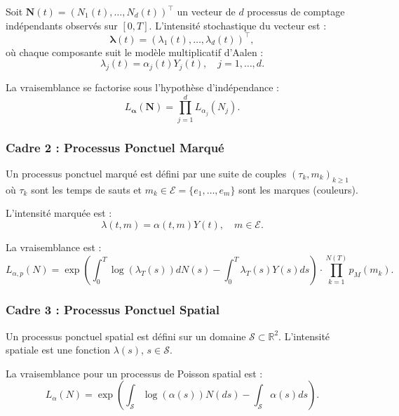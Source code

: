 \documentclass[12pt,a4paper]{article}
\begin{document}
	Soit $\mathbf{N}(t) = (N_1(t), \dots, N_d(t))^\top$ un vecteur de $d$ processus de comptage indépendants observés sur $[0,T]$. L'intensité stochastique du vecteur est :
	\begin{equation}
		\boldsymbol{\lambda}(t) = (\lambda_1(t), \dots, \lambda_d(t))^\top,
	\end{equation}
	où chaque composante suit le modèle multiplicatif d'Aalen :
	\begin{equation}
		\lambda_j(t) = \alpha_j(t)Y_j(t), \quad j = 1, \dots, d.
	\end{equation}
	
	La vraisemblance se factorise sous l'hypothèse d'indépendance :
	\begin{equation}
		L_{\boldsymbol{\alpha}}(\mathbf{N}) = \prod_{j=1}^d L_{\alpha_j}(N_j).
	\end{equation}
	
	\subsubsection{Cadre 2 : Processus Ponctuel Marqué}
	\label{subsubsec:cadre_marque}
	
	Un processus ponctuel marqué est défini par une suite de couples $(\tau_k, m_k)_{k \geq 1}$ où $\tau_k$ sont les temps de sauts et $m_k \in \mathcal{E} = \{e_1, \dots, e_m\}$ sont les marques (couleurs).
	
	L'intensité marquée est :
	\begin{equation}
		\lambda(t, m) = \alpha(t, m)Y(t), \quad m \in \mathcal{E}.
	\end{equation}
	
	La vraisemblance est :
	\begin{equation}
		L_{\alpha, p}(N) = \exp \left( \int_0^T \log(\lambda_T(s)) dN(s) - \int_0^T \lambda_T(s)Y(s) ds \right) \cdot \prod_{k=1}^{N(T)} p_M(m_k).
	\end{equation}
	
	\subsubsection{Cadre 3 : Processus Ponctuel Spatial}
	\label{subsubsec:cadre_spatial}
	
	Un processus ponctuel spatial est défini sur un domaine $\mathcal{S} \subset \mathbb{R}^2$. L'intensité spatiale est une fonction $\lambda(s)$, $s \in \mathcal{S}$.
	
	La vraisemblance pour un processus de Poisson spatial est :
	\begin{equation}
		L_{\alpha}(N) = \exp \left( \int_{\mathcal{S}} \log(\alpha(s)) N(ds) - \int_{\mathcal{S}} \alpha(s) ds \right).
	\end{equation}
	
\end{document}
